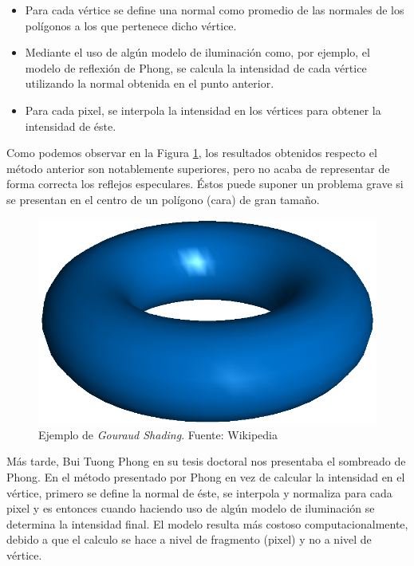 \documentclass[titlepage,12pt]{report}
\begin{document}
\begin{itemize}
	\item Para cada vértice se define una normal como promedio de las normales de los polígonos a los que pertenece dicho vértice.
	\item Mediante el uso de algún modelo de iluminación como, por ejemplo, el modelo de reflexión de Phong, se calcula la intensidad de cada vértice utilizando la normal obtenida en el punto anterior.
	\item Para cada pixel, se interpola la intensidad en los vértices para obtener la intensidad de éste.
\end{itemize} 

Como podemos observar en la Figura \ref{Gouraud:shading}, los resultados obtenidos respecto el método anterior son notablemente superiores, pero no acaba de representar de forma correcta los reflejos especulares. Éstos puede suponer un problema grave si se presentan en el centro de un polígono (cara) de gran tamaño.

\begin{figure}[ht]
	\centering
	\includegraphics[scale=0.25]{media/Gouraudshading00.png}
	\caption{Ejemplo de \textit{Gouraud Shading}. Fuente: Wikipedia}
	\label{Gouraud:shading}
\end{figure}

Más tarde, Bui Tuong Phong en su tesis doctoral \citep{Phong1975} nos presentaba el sombreado de Phong. En el método presentado por Phong en vez de calcular la intensidad en el vértice, primero se define la normal de éste, se interpola y normaliza para cada pixel y es entonces cuando haciendo uso de algún modelo de iluminación se determina la intensidad final. El modelo resulta más costoso computacionalmente, debido a que el calculo se hace a nivel de fragmento (pixel) y no a nivel de vértice.
\end{document}
